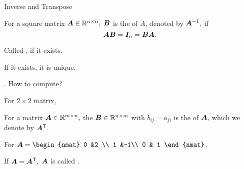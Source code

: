 \documentclass[fleqn,aspectratio=169]{beamer}
\begin{document}
\begin{frame}{Inverse and Transpose}

{
\plitemsep 0.1in
\bci 
\item For a square matrix $\bm{A} \in {\mathbb R}^{n \times n},$ $\bm{B}$ is the  of $A$, denoted by ${{\bm{A}}^{-1}},$ if $$\bm{AB} = \bm{I}_n = \bm{BA}.$$

\item Called , if it exists.  

\item If it exists, it is unique. 

\item {}. How to compute?

\item For $2\times 2$ matrix, 
\eci
}
{
\plitemsep 0.1in
\bci 
\item For a matrix $\bm{A} \in {\mathbb R}^{m \times n},$ the $\bm{B} \in {\mathbb R}^{n \times m}$ with $b_{ij} = a_{ji}$ is the  of $\bm{A},$ which we denote by ${\bm{A}}^{\mathsf{T}}.$ 

\item \exam For 
$\mat{A} = 
\begin{nmat} 
 0 &2 \\
 1  &-1\\
 0  & 1
\end{nmat}
$,

\item If $\bm{A} = {\bm{A}}^{\mathsf{T}},$ $\bm{A}$ is called .
\eci
}

\end{frame}
\end{document}
